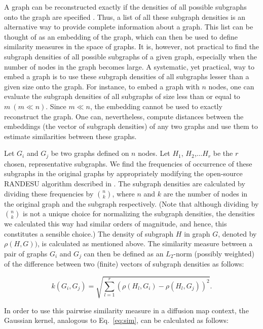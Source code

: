% 
A graph can be reconstructed exactly if the densities of all possible
subgraphs onto the graph are specified \cite{lovasz_limits_2006}.
% 
Thus, a list of all these subgraph densities is an alternative way to
provide complete information about a graph.
% 
This list can be thought of as an embedding of the graph, which can
then be used to define similarity measures in the space of graphs.
% 
It is, however, not practical to find the subgraph densities of all
possible subgraphs of a given graph, especially when the number of
nodes in the graph becomes large.
% 
A systematic, yet practical, way to embed a graph is to use these
subgraph densities of all subgraphs lesser than a given size onto the
graph.
% 
For instance, to embed a graph with $n$ nodes, one can evaluate the
subgraph densities of all subgraphs of size less than or equal to
$m~(m \ll n)$.
% 
Since $m \ll n$, the embedding cannot be used to exactly reconstruct
the graph.
% 
One can, nevertheless, compute distances between the embeddings (the
vector of subgraph densities) of any two graphs and use them to
estimate similarities between these graphs.
% 

Let $G_i$ and $G_j$ be two graphs defined on $n$ nodes.
% 
Let $H_1$, $H_2$,$\ldots H_r$ be the $r$ chosen, representative
subgraphs.
% 
We find the frequencies of occurrence of these subgraphs in the
original graphs by appropriately modifying the open-source RANDESU
algorithm described in \cite{wernicke_fanmod:_2006:}.
% 
The subgraph densities are calculated by dividing these frequencies by
$n\choose{k}$, where $n$ and $k$ are the number of nodes in the
original graph and the subgraph respectively.
% 
(Note that although dividing by $n\choose{k}$ is not a unique choice
for normalizing the subgraph densities, the densities we calculated
this way had similar orders of magnitude, and hence, this constitutes
a sensible choice.)
% 
The density of subgraph $H$ in graph $G$, denoted by $\rho(H,G))$, is
calculated as mentioned above.
% 
The similarity measure between a pair of graphs $G_i$ and $G_j$ can
then be defined as an $L_2$-norm (possibly weighted) of the difference
between two (finite) vectors of subgraph densities as follows:

\begin{equation}
  k(G_i,G_j) = \sqrt{\sum_{l=1}^{r}\left(\rho(H_l,G_i)-\rho(H_l,G_j)\right)^2}.
  \label{eq:k1}
\end{equation}

In order to use this pairwise similarity measure in a diffusion map
context, the Gaussian kernel, analogous to Eq.~\ref{eq:sim}, can be
calculated as follows:

